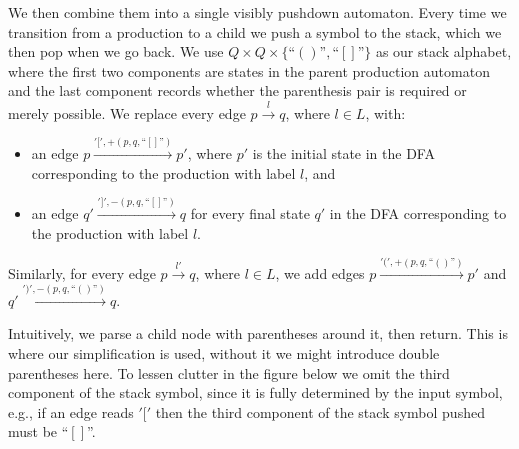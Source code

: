 \documentclass[acmsmall,review,anonymous]{acmart}\settopmatter{printfolios=true,printccs=false,printacmref=false}
\newcommand{\Labels}{L} %
\newcommand{\reqpl}{(}
\newcommand{\reqpr}{)}
\newcommand{\reqp}[1]{\reqpl#1\reqpr}
\newcommand{\pospl}{[}
\newcommand{\pospr}{]}
\newcommand{\posp}[1]{\pospl#1\pospr}
\begin{document}
\noindent We then combine them into a single visibly pushdown automaton. Every time we transition from a production to a child we push a symbol to the stack, which we then pop when we go back. We use $Q \times Q \times \{\text{``}\reqp{}\text{''}, \text{``}\posp{}\text{''}\}$ as our stack alphabet, where the first two components are states in the parent production automaton and the last component records whether the parenthesis pair is required or merely possible. We replace every edge $p \xrightarrow{l} q$, where $l \in \Labels$, with:

\begin{itemize}
  \item an edge $p \xrightarrow{'\pospl', +(p, q, \text{``}\posp{}\text{''})} p'$, where $p'$ is the initial state in the DFA corresponding to the production with label $l$, and
  \item an edge $q' \xrightarrow{'\pospr', -(p, q, \text{``}\posp{}\text{''})} q$ for every final state $q'$ in the DFA corresponding to the production with label $l$.
\end{itemize}

\noindent Similarly, for every edge $p \xrightarrow{l'} q$, where $l \in \Labels$, we add edges $p \xrightarrow{'\reqpl', +(p, q, \text{``}\reqp{}\text{''})} p'$ and $q' \xrightarrow{'\reqpr', -(p, q, \text{``}\reqp{}\text{''})} q$.

Intuitively, we parse a child node with parentheses around it, then return. This is where our simplification is used, without it we might introduce double parentheses here. To lessen clutter in the figure below we omit the third component of the stack symbol, since it is fully determined by the input symbol, e.g., if an edge reads $'\pospl'$ then the third component of the stack symbol pushed must be ``$\posp{}$''.

\begin{center}
\end{center}
\end{document}
